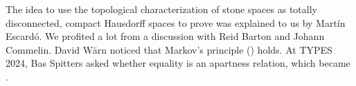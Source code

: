 The idea to use the topological characterization of stone spaces as totally disconnected, compact Hausdorff spaces to prove  was explained to us by Martín Escardó.
We profited a lot from a discussion with Reid Barton and Johann Commelin. 
David Wärn noticed that Markov's principle () holds. 
At TYPES 2024, Bas Spitters asked whether equality is an apartness relation, 
which became .
